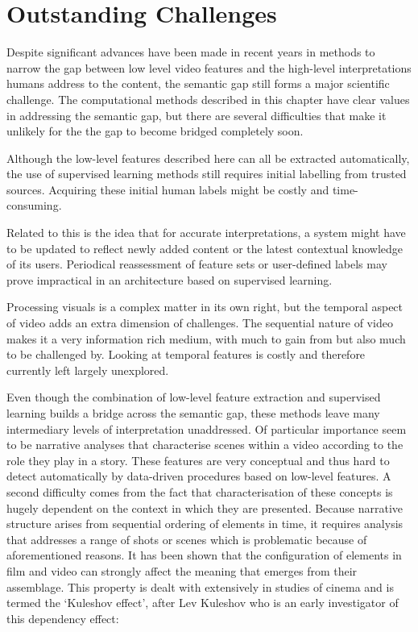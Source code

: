 \section{Outstanding Challenges} %
\label{sec:outstanding_challenges}

Despite significant advances have been made in recent years in methods to narrow the gap between low level video features and the high-level interpretations humans address to the content, the semantic gap still forms a major scientific challenge. The computational methods described in this chapter have clear values in addressing the semantic gap, but there are several difficulties that make it unlikely for the the gap to become bridged completely soon.

Although the low-level features described here can all be extracted automatically, the use of supervised learning methods still requires initial labelling from trusted sources. Acquiring these initial human labels might be costly and time-consuming.

Related to this is the idea that for accurate interpretations, a system might have to be updated to reflect newly added content or the latest contextual knowledge of its users. Periodical reassessment of feature sets or user-defined labels may prove impractical in an architecture based on supervised learning.

Processing visuals is a complex matter in its own right, but the temporal aspect of video adds an extra dimension of challenges. The sequential nature of video makes it a very information rich medium, with much to gain from but also much to be  challenged by. Looking at temporal features is costly and therefore currently left largely unexplored.

Even though the combination of low-level feature extraction and supervised learning builds a bridge across the semantic gap, these methods leave many intermediary levels of interpretation unaddressed. Of particular importance seem to be narrative analyses that characterise scenes within a video according to the role they play in a story. These features are very conceptual and thus hard to detect automatically by data-driven procedures based on low-level features. A second difficulty comes from the fact that characterisation of these concepts is hugely dependent on the context in which they are presented. Because narrative structure arises from sequential ordering of elements in time, it requires analysis that addresses a range of shots or scenes which is problematic because of aforementioned reasons. It has been shown that the configuration of elements in film and video can strongly affect the meaning that emerges from their assemblage. This property is dealt with extensively in studies of cinema\cite{Bordwell:1985tz} and is termed the `Kuleshov effect', after Lev Kuleshov who is an early investigator of this dependency effect:

